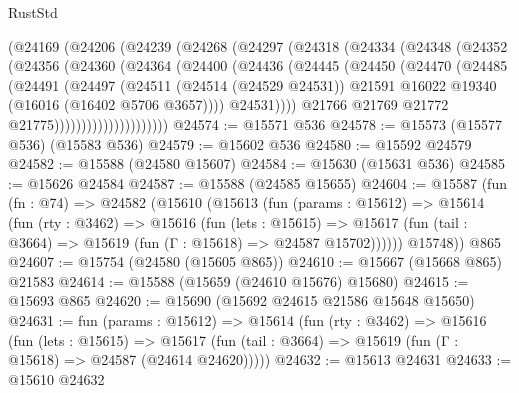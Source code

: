 \begin{lexlean}{RustStd}
\begin{coremodule}
                (@24169
                  (@24206
                    (@24239
                      (@24268
                        (@24297
                          (@24318
                            (@24334
                              (@24348
                                (@24352
                                  (@24356
                                    (@24360
                                      (@24364
                                        (@24400
                                          (@24436
                                            (@24445
                                              (@24450
                                                (@24470
                                                  (@24485
                                                    (@24491
                                                      (@24497
                                                        (@24511
                                                          (@24514 (@24529 @24531))
                                                          @21591
                                                          @16022
                                                          @19340
                                                          (@16016 (@16402 @5706 @3657))))
                                                      @24531))))
                                              @21766
                                              @21769
                                              @21772
                                              @21775)))))))))))))))))))))
@24574 := @15571 @536
@24578 := @15573 (@15577 @536) (@15583 @536)
@24579 := @15602 @536
@24580 := @15592 @24579
@24582 := @15588 (@24580 @15607)
@24584 := @15630 (@15631 @536)
@24585 := @15626 @24584
@24587 := @15588 (@24585 @15655)
@24604 := @15587
    (fun (fn : @74) =>
    @24582
      (@15610
        (@15613
          (fun (params : @15612) =>
          @15614
            (fun (rty : @3462) =>
            @15616
              (fun (lets : @15615) =>
              @15617 (fun (tail : @3664) => @15619 (fun (Γ : @15618) => @24587 @15702))))))
        @15748))
    @865
@24607 := @15754 (@24580 (@15605 @865))
@24610 := @15667 (@15668 @865) @21583
@24614 := @15588 (@15659 (@24610 @15676) @15680)
@24615 := @15693 @865
@24620 := @15690 (@15692 @24615 @21586 @15648 @15650)
@24631 := fun (params : @15612) =>
  @15614
    (fun (rty : @3462) =>
    @15616
      (fun (lets : @15615) =>
      @15617 (fun (tail : @3664) => @15619 (fun (Γ : @15618) => @24587 (@24614 @24620)))))
@24632 := @15613 @24631
@24633 := @15610 @24632

\end{coremodule}
\end{lexlean}
